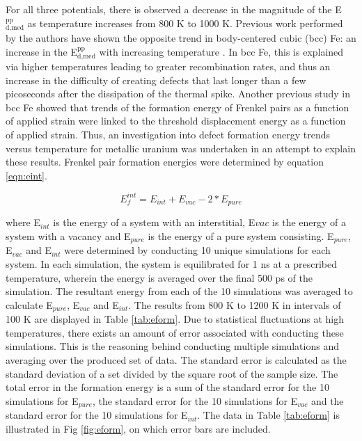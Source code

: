 \documentclass[review]{elsarticle}
\begin{document}
\FloatBarrier

For all three potentials, there is observed a decrease in the magnitude of the E$^{\textrm{pp}}_{\textrm{d,med}}$ as temperature increases from 800 K to 1000 K. Previous work performed by the authors have shown the opposite trend in body-centered cubic (bcc) Fe: an increase in the E$^{\textrm{pp}}_{\textrm{d,med}}$ with increasing temperature \cite{beeler2016}. In bcc Fe, this is explained via higher temperatures leading to greater recombination rates, and thus an increase in the difficulty of creating defects that last longer than a few picoseconds after the dissipation of the thermal spike. Another previous study in bcc Fe \cite{beeler2015, beeler2016} showed that trends of the formation energy of Frenkel pairs as a function of applied strain were linked to the threshold displacement energy as a function of applied strain. Thus, an investigation into defect formation energy trends versus temperature for metallic uranium was undertaken in an attempt to explain these results. Frenkel pair formation energies were determined by equation \ref{eqn:eint}.

\begin{equation}
\label{eqn:eint}
E_{f}^{int} = E_{int} + E_{vac} - 2*E_{pure}
\end{equation} 

where E$_{int}$ is the energy of a system with an interstitial, E${vac}$ is the energy of a system with a vacancy and E$_{pure}$ is the energy of a pure system consisting. E$_{pure}$, E$_{vac}$ and E$_{int}$ were determined by conducting 10 unique simulations for each system. In each simulation, the system is equilibrated for 1 ns at a prescribed temperature, wherein the energy is averaged over the final 500 ps of the simulation. The resultant energy from each of the 10 simulations was averaged to calculate E$_{pure}$, E$_{vac}$ and E$_{int}$. The results from 800 K to 1200 K in intervals of 100 K are displayed in Table \ref{tab:eform}. Due to statistical fluctuations at high temperatures, there exists an amount of error associated with conducting these simulations. This is the reasoning behind conducting multiple simulations and averaging over the produced set of data. The standard error is calculated as the standard deviation of a set divided by the square root of the sample size. The total error in the formation energy is a sum of the standard error for the 10 simulations for E$_{pure}$, the standard error for the 10 simulations for E$_{vac}$ and the standard error for the 10 simulations for E$_{int}$. The data in Table \ref{tab:eform} is illustrated in Fig \ref{fig:eform}, on which error bars are included. 
\end{document}
